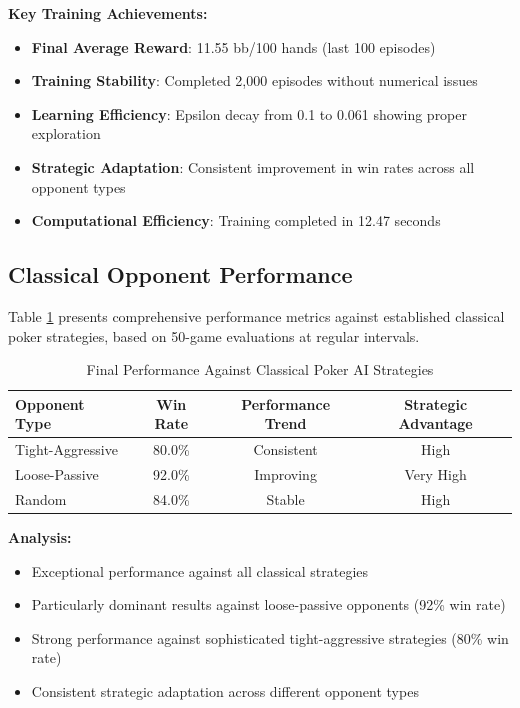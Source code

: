 \documentclass[11pt,a4paper]{article}
\begin{document}
\textbf{Key Training Achievements:}
\begin{itemize}
\item \textbf{Final Average Reward}: 11.55 bb/100 hands (last 100 episodes)
\item \textbf{Training Stability}: Completed 2,000 episodes without numerical issues
\item \textbf{Learning Efficiency}: Epsilon decay from 0.1 to 0.061 showing proper exploration
\item \textbf{Strategic Adaptation}: Consistent improvement in win rates across all opponent types
\item \textbf{Computational Efficiency}: Training completed in 12.47 seconds
\end{itemize}

\subsection{Classical Opponent Performance}

Table \ref{tab:classical_results} presents comprehensive performance metrics against established classical poker strategies, based on 50-game evaluations at regular intervals.

\begin{table}[h]
\centering
\begin{tabular}{@{}lccc@{}}
\toprule
\textbf{Opponent Type} & \textbf{Win Rate} & \textbf{Performance Trend} & \textbf{Strategic Advantage} \\
\midrule
Tight-Aggressive & 80.0\% & Consistent & High \\
Loose-Passive & 92.0\% & Improving & Very High \\
Random & 84.0\% & Stable & High \\
\bottomrule
\end{tabular}
\caption{Final Performance Against Classical Poker AI Strategies}
\label{tab:classical_results}
\end{table}

\textbf{Analysis:}
\begin{itemize}
\item Exceptional performance against all classical strategies
\item Particularly dominant results against loose-passive opponents (92\% win rate)
\item Strong performance against sophisticated tight-aggressive strategies (80\% win rate)
\item Consistent strategic adaptation across different opponent types
\end{itemize}
\end{document}
